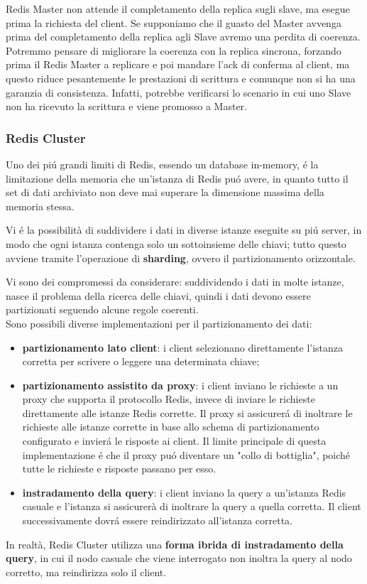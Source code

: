 Redis Master non attende il completamento della replica sugli slave, ma esegue prima la richiesta del client.
Se supponiamo che il guasto del Master avvenga prima del completamento della replica agli Slave avremo una perdita di coerenza.\\

Potremmo pensare di migliorare la coerenza con la replica sincrona, forzando prima il Redis Master a replicare e poi mandare l'ack
di conferma al client, ma questo riduce pesantemente le prestazioni di scrittura e comunque non si ha una garanzia di consistenza.
Infatti, potrebbe verificarsi lo scenario in cui uno Slave non ha ricevuto la scrittura e viene promosso a Master.


\subsubsection{Redis Cluster}
Uno dei piú grandi limiti di Redis, essendo un database in-memory, é la limitazione della memoria che un'istanza di Redis puó avere, in quanto
tutto il set di dati archiviato non deve mai superare la dimensione massima della memoria stessa.

Vi é la possibilità di suddividere i dati in diverse istanze eseguite su piú server, in modo che ogni
istanza contenga solo un sottoinsieme delle chiavi; tutto questo avviene tramite l'operazione di
\textbf{sharding}, ovvero il partizionamento orizzontale.

Vi sono dei compromessi da considerare: suddividendo i dati in molte istanze, nasce il problema della
ricerca delle chiavi, quindi i dati devono essere partizionati seguendo alcune regole coerenti.\\
Sono possibili diverse implementazioni per il partizionamento dei dati:
\begin{itemize}
    \item \textbf{partizionamento lato client}: i client selezionano direttamente l'istanza corretta per
    scrivere o leggere una determinata chiave;
    \item \textbf{partizionamento assistito da proxy}: i client inviano le richieste a un proxy che supporta il protocollo Redis,
    invece di inviare le richieste direttamente alle istanze Redis corrette. Il proxy si assicurerá di inoltrare le richieste
    alle istanze corrette in base allo schema di partizionamento configurato e invierá le risposte ai client.
    Il limite principale di questa implementazione é che il proxy puó diventare un "collo di bottiglia", poiché
    tutte le richieste e risposte passano per esso.
    \item \textbf{instradamento della query}: i client inviano la query a un'istanza Redis casuale e l'istanza si
    assicurerà di inoltrare la query a quella corretta.
    Il client successivamente dovrá essere reindirizzato all'istanza corretta.
\end{itemize}
In realtà, Redis Cluster utilizza una \textbf{forma ibrida di instradamento della query}, in cui il nodo casuale che viene interrogato
non inoltra la query al nodo corretto, ma reindirizza solo il client.\\

